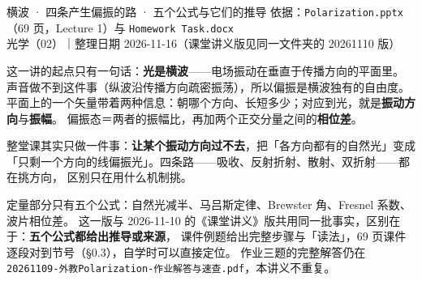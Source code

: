 \documentclass[11pt]{ctexart}
\let\subhdrtheme\subhdr
\renewcommand{\subhdr}[1]{\needspace{4\baselineskip}\subhdrtheme{#1}}
\let\hdrorig\hdr
\renewcommand{\hdr}[2]{\needspace{8\baselineskip}\hdrorig{#1}{#2}}
\begin{document}
{横波 · 四条产生偏振的路 · 五个公式与它们的推导}
{依据：\texttt{Polarization.pptx}（69 页，Lecture 1）与 \texttt{Homework Task.docx}\\
光学（02）｜整理日期 2026-11-16（课堂讲义版见同一文件夹的 20261110 版）}


这一讲的起点只有一句话：\textbf{光是横波}——电场振动在垂直于传播方向的平面里。
声音做不到这件事（纵波沿传播方向疏密振荡），所以偏振是横波独有的自由度。
平面上的一个矢量带着两种信息：朝哪个方向、长短多少；对应到光，就是\textbf{振动方向}与\textbf{振幅}。
偏振态＝两者的振幅比，再加两个正交分量之间的\textbf{相位差}。

整堂课其实只做一件事：\textbf{让某个振动方向过不去}，把「各方向都有的自然光」变成
「只剩一个方向的线偏振光」。四条路——吸收、反射折射、散射、双折射——都在挑方向，
区别只在用什么机制挑。

定量部分只有五个公式：自然光减半、马吕斯定律、Brewster 角、Fresnel 系数、波片相位差。
这一版与 2026-11-10 的《课堂讲义》版共用同一批事实，区别在于：\textbf{五个公式都给出推导或来源}，
课件例题给出完整步骤与「读法」，69 页课件逐段对到节号（§0.3），自学时可以直接定位。
作业三题的完整解答仍在 \texttt{20261109-外教Polarization-作业解答与速查.pdf}，本讲义不重复。

\end{document}
